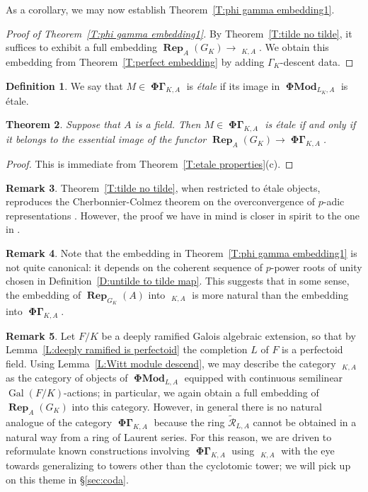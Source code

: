 \documentclass[12pt]{amsart}
\newtheorem{theorem}{Theorem}[section]
\theoremstyle{definition}
\newtheorem{defn}[theorem]{Definition}
\newtheorem{remark}[theorem]{Remark}
\numberwithin{equation}{theorem}
\newcommand{\calR}{\mathcal{R}}
\DeclareMathOperator{\Gal}{Gal}
\DeclareMathOperator{\PhiGamma}{\mathbf{\Phi \Gamma}}
\DeclareMathOperator{\PhiGammatilde}{\widetilde{\mathbf{\Phi \Gamma}}}
\DeclareMathOperator{\PhiMod}{\mathbf{\Phi Mod}}
\DeclareMathOperator{\Rep}{\mathbf{Rep}}
\begin{document}
As a corollary, we may now establish Theorem~\ref{T:phi gamma embedding1}.
\begin{proof}[Proof of Theorem~\ref{T:phi gamma embedding1}]
By Theorem~\ref{T:tilde no tilde}, it suffices to exhibit a full embedding
$\Rep_A(G_K) \to \PhiGammatilde_{K,A}$. We obtain this embedding from
Theorem~\ref{T:perfect embedding} by adding $\Gamma_K$-descent data.
\end{proof}

\begin{defn}
We say that $M \in \PhiGamma_{K,A}$ is \emph{\'etale} if its image in $\PhiMod_{L_K,A}$ is \'etale. 
\end{defn}

\begin{theorem}
Suppose that $A$ is a field. Then $M \in \PhiGamma_{K,A}$ is \'etale if and only if it belongs
to the essential image of the functor $\Rep_A(G_K)\to \PhiGamma_{K,A}$.
\end{theorem}
\begin{proof}
This is immediate from Theorem~\ref{T:etale properties}(c).
\end{proof}

\begin{remark}
Theorem~\ref{T:tilde no tilde}, when restricted to \'etale objects, reproduces the Cherbonnier-Colmez theorem on the overconvergence of $p$-adic representations \cite{cherbonnier-colmez}. However, the proof we have in mind is closer in spirit to the one in \cite[\S 2]{kedlaya-new-phigamma}.
\end{remark}

\begin{remark}
Note that the embedding in Theorem~\ref{T:phi gamma embedding1} is not quite canonical: it depends on the coherent sequence of $p$-power roots of unity chosen in Definition~\ref{D:untilde to tilde map}. This suggests that in some sense, the embedding of $\Rep_{G_K}(A)$ into $\PhiGammatilde_{K,A}$  is more natural than the embedding into $\PhiGamma_{K,A}$.
\end{remark}

\begin{remark}
Let $F/K$ be a deeply ramified Galois algebraic extension, so that by Lemma~\ref{L:deeply ramified is perfectoid} the completion $L$ of $F$ is a perfectoid field. 
Using Lemma~\ref{L:Witt module descend}, we may describe the category
$\PhiGammatilde_{K,A}$ as the category of objects of $\PhiMod_{L,A}$ equipped with continuous semilinear $\Gal(F/K)$-actions; in particular, we again obtain a full embedding
of $\Rep_A(G_K)$ into this category. However, in general there is no natural analogue of the category $\PhiGamma_{K,A}$ because the ring $\tilde{\calR}_{L,A}$ cannot be obtained in a natural way from a ring of Laurent series. For this reason, we are driven to reformulate known constructions involving $\PhiGamma_{K,A}$ using $\PhiGammatilde_{K,A}$ with the eye towards generalizing to towers other than the cyclotomic tower; we will pick up on this theme
in \S\ref{sec:coda}.
\end{remark}
\end{document}
